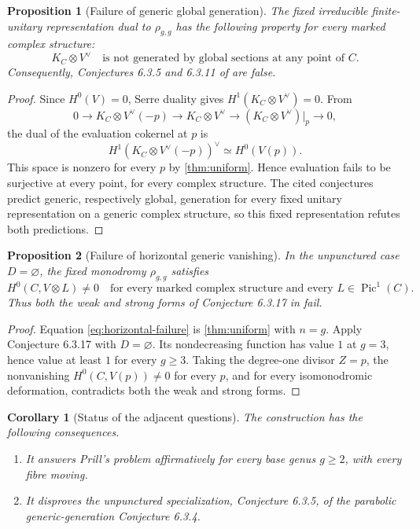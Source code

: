 \documentclass[11pt,reqno]{amsart}
\numberwithin{equation}{section}
\newtheorem{proposition}[proposition]{Proposition}
\newtheorem{corollary}[corollary]{Corollary}
\theoremstyle{remark}
\DeclareMathOperator{\Pic}{Pic}
\begin{document}
\begin{proposition}[Failure of generic global generation]\label{prop:ggg-failure}
The fixed irreducible finite-unitary representation dual to
\(\rho_{g,g}\) has the following property for every marked complex
structure:
\[
 K_C\otimes V^\vee
\quad\text{is not generated by global sections at any point of }C.
\tag{7.1}\label{eq:nowhere-ggg}
\]
Consequently, Conjectures 6.3.5 and 6.3.11 of
\cite{LittMotives} are false.
\end{proposition}

\begin{proof}
Since \(H^0(V)=0\), Serre duality gives
\(H^1(K_C\otimes V^\vee)=0\).  From
\[
 0\longrightarrow K_C\otimes V^\vee(-p)
 \longrightarrow K_C\otimes V^\vee
 \longrightarrow (K_C\otimes V^\vee)|_p
 \longrightarrow0,
\]
the dual of the evaluation cokernel at \(p\) is
\[
 H^1(K_C\otimes V^\vee(-p))^\vee
 \simeq H^0(V(p)).
\tag{7.2}\label{eq:evaluation-dual}
\]
This space is nonzero for every \(p\) by \cref{thm:uniform}.  Hence
evaluation fails to be surjective at every point, for every complex
structure.  The cited conjectures predict generic, respectively global,
generation for every fixed unitary representation on a generic complex
structure, so this fixed representation refutes both predictions.
\end{proof}

\begin{proposition}[Failure of horizontal generic vanishing]\label{prop:HGV-failure}
In the unpunctured case \(D=\varnothing\), the fixed monodromy
\(\rho_{g,g}\) satisfies
\[
 H^0(C,V\otimes L)\neq0
 \quad\text{for every marked complex structure and every }
 L\in\Pic^1(C).
\tag{7.3}\label{eq:horizontal-failure}
\]
Thus both the weak and strong forms of Conjecture 6.3.17 in
\cite{LittMotives} fail.
\end{proposition}

\begin{proof}
Equation \eqref{eq:horizontal-failure} is
\cref{thm:uniform} with \(n=g\).  Apply Conjecture 6.3.17 with
\(D=\varnothing\).  Its nondecreasing function has value \(1\) at
\(g=3\), hence value at least \(1\) for every \(g\geq3\).  Taking the
degree-one divisor \(Z=p\), the nonvanishing
\(H^0(C,V(p))\neq0\) for every \(p\), and for every isomonodromic
deformation, contradicts both the weak and strong forms.
\end{proof}

\begin{corollary}[Status of the adjacent questions]\label{cor:question-status}
The construction has the following consequences.
\begin{enumerate}[label=\textup{(\roman*)}]
\item It answers Prill's problem affirmatively for every base genus
\(g\geq2\), with every fibre moving.
\item It disproves the unpunctured specialization, Conjecture 6.3.5, of
the parabolic generic-generation Conjecture 6.3.4.
\end{enumerate}
\end{corollary}
\end{document}
